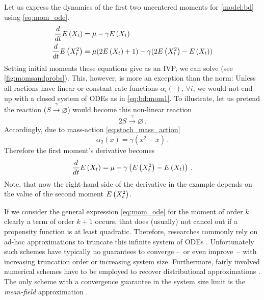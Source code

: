 \begin{example} Let us express the dynamics of the first two
  uncentered moments for \autoref{model:bd} using \eqref{eq:mom_ode}.
  \begin{equation}\label{eq:bd:mom1}
    \begin{split}
      \frac{d}{dt}\E{X_t} =\; &\mu - \gamma \E{X_t}\\
      \frac{d}{dt}\E{X_t^2} =\; &\mu(2\E{X_t} + 1) - \gamma
      (2\E{X_t^2}-\E{X_t})%
    \end{split}
  \end{equation}
  Setting initial moments these equations give as an \ac{IVP}, we can
  solve (see \autoref{fig:momsandprobs}).
  This, however, is more an exception than the norm:
  Unless all ractions have linear or constant rate functions
  $\alpha_i(\cdot)$, $\forall i$, we would not end up with a closed
  system of \acp{ODE} as in \eqref{eq:bd:mom1}.
  To illustrate, let us pretend the reaction
  ($S\xrightarrow{\gamma}\varnothing$) would become this non-linear
  reaction
  \[
    2S\xrightarrow{\gamma}\varnothing\,.
  \]
  Accordingly, due to mass-action \eqref{eq:stoch_mass_action}
  \[
    \alpha_2(x)=\gamma (x^2 - x)\,.
  \]
  Therefore the first moment's derivative becomes
  \[
    \frac{d}{dt}{E}\left(X_t\right) =\mu - \gamma \left({E}\left(X_t^2\right) - {E}\left(X_t\right)\right)\,.
  \]
  Note, that now the right-hand side of the derivative in the example
  depends on the value of the second moment ${E}\left(X_t^2\right)$.
\end{example}
If we consider the general expression \eqref{eq:mom_ode} for the
moment of order $k$ clearly a term of order $k+1$ occurs, that does
(usually) not cancel out if a propensity function is at least
quadratic.
Therefore, researches commonly rely on ad-hoc approximations to
truncate this infinite system of \acp{ODE}
\parencite{hespanha2008moment,schnoerr2015,schnoerr2014validity}.
Unfortunately such schemes have typically no guarantees to converge
--~or even improve~-- with increasing truncation order
\parencite{schnoerr2014validity} or increasing system size.
Furthermore,
fairly involved numerical schemes have to be employed to recover
distributional approximations \parencite{andreychenko2017distribution}.
The only scheme with a convergence guarantee in the system size limit
is the \emph{mean-field} approximation \parencite{bortolussi2013continuous}.

